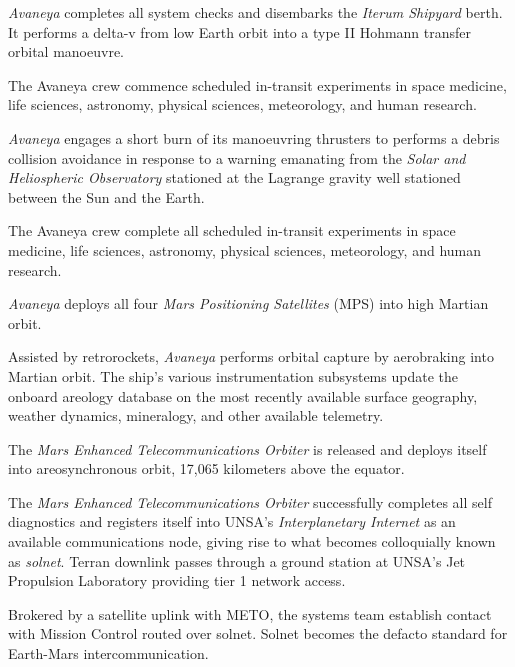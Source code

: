 {\it Avaneya} completes all system checks and disembarks the {\it Iterum Shipyard} berth. It performs a delta-v from low Earth orbit into a type II Hohmann transfer orbital manoeuvre.
\StopTimelineDate

The Avaneya crew commence scheduled in-transit experiments in space medicine, life sciences, astronomy, physical sciences, meteorology, and human research.
\StopTimelineDate

{\it Avaneya} engages a short burn of its manoeuvring thrusters to performs a debris collision avoidance in response to a warning emanating from the {\it Solar and Heliospheric Observatory} stationed at the Lagrange  gravity well stationed between the Sun and the Earth.
\StopTimelineDate

The Avaneya crew complete all scheduled in-transit experiments in space medicine, life sciences, astronomy, physical sciences, meteorology, and human research.
\StopTimelineDate

{\it Avaneya} deploys all four {\it Mars Positioning Satellites} (MPS) into high Martian orbit.
\StopTimelineDate

Assisted by retrorockets, {\it Avaneya} performs orbital capture by aerobraking into Martian orbit. The ship's various instrumentation subsystems update the onboard areology database on the most recently available surface geography, weather dynamics, mineralogy, and other available telemetry.

The {\it Mars Enhanced Telecommunications Orbiter} is released and deploys itself into areosynchronous orbit, 17,065 kilometers above the equator.

The {\it Mars Enhanced Telecommunications Orbiter} successfully completes all self diagnostics and registers itself into UNSA's {\it Interplanetary Internet} as an available communications node, giving rise to what becomes colloquially known as {\it solnet}. Terran downlink passes through a ground station at UNSA's Jet Propulsion Laboratory providing tier 1 network access.

Brokered by a satellite uplink with METO, the systems team establish contact with Mission Control routed over solnet. Solnet becomes the defacto standard for Earth-Mars intercommunication.
\StopTimelineDate

